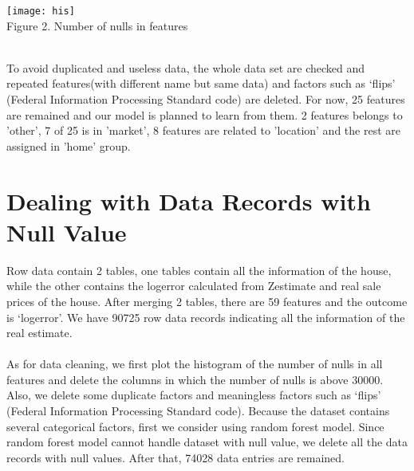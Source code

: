 \documentclass[12pt]{article}
\begin{document}
\begin{center}
\texttt{[image: his]}\\
Figure 2. Number of nulls in features
\end{center}\\To avoid duplicated and useless data, the whole data set are checked and repeated features(with different name but same data) and factors such as ‘flips’ (Federal Information Processing Standard code) are deleted. For now, 25 features are remained and our model is planned to learn from them.  2 features belongs to 'other', 7 of 25 is in 'market', 8 features are related to 'location' and the rest are assigned in 'home' group.

\section{Dealing with Data Records with Null Value}
Row data contain 2 tables, one tables contain all the information of the house, while the other contains the logerror calculated from Zestimate and real sale prices of the house. After merging 2 tables, there are 59 features and the outcome is ‘logerror’. We have 90725 row data records indicating all the information of the real estimate. \\ 
\\As for data cleaning, we first plot the histogram of the number of nulls in all features and delete the columns in which the number of nulls is above 30000. Also, we delete some duplicate factors and meaningless factors such as ‘flips’ (Federal Information Processing Standard code). Because the dataset contains several categorical factors, first we consider using random forest model. Since random forest model cannot handle dataset with null value, we delete all the data records with null values. After that, 74028 data entries are remained.
\end{document}
